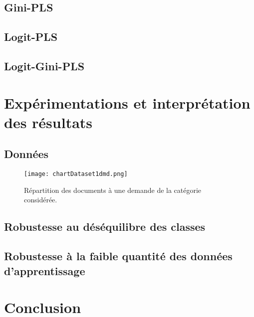 \subsection{Gini-PLS}
\subsection{Logit-PLS}
\subsection{Logit-Gini-PLS}

\section{Expérimentations et interprétation des résultats}
\label{sec:sensresultat:experimentations}

\subsection{Données}
\label{subsec:sensresultat:xp:data}

\begin{figure}[!h]
\texttt{[image: chartDataset1dmd.png]}
\caption{Répartition des documents à une demande de la catégorie considérée.}\label{stat-1dmd}
\end{figure}

\subsection{Robustesse au déséquilibre des classes}

\subsection{Robustesse à la faible quantité des données d'apprentissage}

\section{Conclusion}
\label{sec:sensresultat:conclusion}
